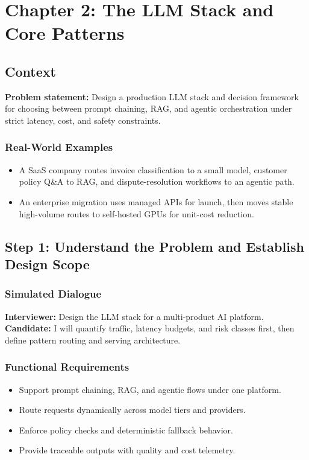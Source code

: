 \chapter{Chapter 2: The LLM Stack and Core Patterns}

\section*{Context}
\textbf{Problem statement:} Design a production LLM stack and decision framework for choosing between prompt chaining, RAG, and agentic orchestration under strict latency, cost, and safety constraints.


\subsection*{Real-World Examples}
\begin{itemize}
  \item A SaaS company routes invoice classification to a small model, customer policy Q&A to RAG, and dispute-resolution workflows to an agentic path.
  \item An enterprise migration uses managed APIs for launch, then moves stable high-volume routes to self-hosted GPUs for unit-cost reduction.
\end{itemize}

\section*{Step 1: Understand the Problem and Establish Design Scope}
\subsection*{Simulated Dialogue}
\textbf{Interviewer:} Design the LLM stack for a multi-product AI platform.\\
\textbf{Candidate:} I will quantify traffic, latency budgets, and risk classes first, then define pattern routing and serving architecture.

\subsection*{Functional Requirements}
\begin{itemize}
  \item Support prompt chaining, RAG, and agentic flows under one platform.
  \item Route requests dynamically across model tiers and providers.
  \item Enforce policy checks and deterministic fallback behavior.
  \item Provide traceable outputs with quality and cost telemetry.
\end{itemize}


